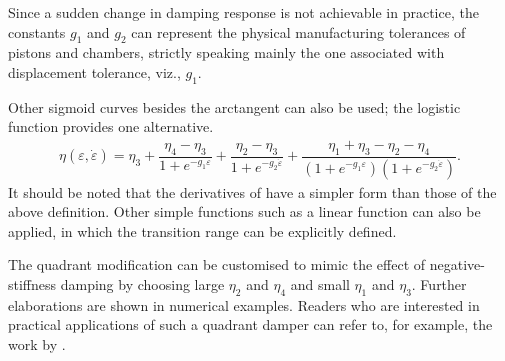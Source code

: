 Since a sudden change in damping response is not achievable in practice, the constants $g_1$ and $g_2$ can represent the physical manufacturing tolerances of pistons and chambers, strictly speaking mainly the one associated with displacement tolerance, viz., $g_1$.

Other sigmoid curves besides the arctangent can also be used; the logistic function provides one alternative.
\begin{gather}
\eta\left(\varepsilon,\dot\varepsilon\right)=\eta_3+\dfrac{\eta_4-\eta_3}{1+e^{-g_1\varepsilon}}+\dfrac{\eta_2-\eta_3}{1+e^{-g_2\dot{\varepsilon}}}+\dfrac{\eta_1+\eta_3-\eta_2-\eta_4}{\left(1+e^{-g_1\varepsilon}\right)\left(1+e^{-g_2\dot{\varepsilon}}\right)}.
\end{gather}
It should be noted that the derivatives of  have a simpler form than those of the above definition.
Other simple functions such as a linear function can also be applied, in which the transition range can be explicitly defined.

The quadrant modification can be customised to mimic the effect of negative-stiffness damping \cite{Iemura2009,Hoegsberg2011,Zhou2015,Javanbakht2018} by choosing large $\eta_2$ and $\eta_4$ and small $\eta_1$ and $\eta_3$.
Further elaborations are shown in numerical examples.
Readers who are interested in practical applications of such a quadrant damper can refer to, for example, the work by \cite{Hazaveh2017}.
